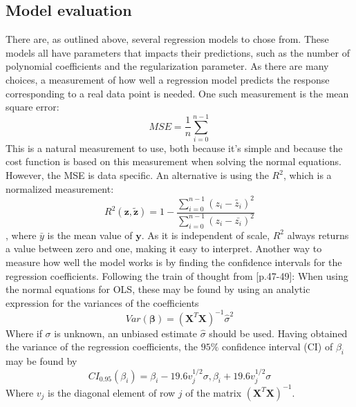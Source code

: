 \documentclass[%
oneside,                 %
final,                   %
10pt]{article}
\begin{document}
\subsection{Model evaluation} 
There are, as outlined above, several regression models to chose from. These models all have parameters that impacts their predictions, such as the number of polynomial coefficients and the regularization parameter. As there are many choices, a measurement of how well a regression model predicts the response corresponding to a real data point is needed. One such measurement is the mean square error:
\begin{equation}
MSE=\displaystyle \frac{1}{n}\sum_{i=0}^{n-1} \label{eq:MSE}
\end{equation}
This is a natural measurement to use, both because it's simple and because the cost function is based on this measurement when solving the normal equations. However, the MSE is data specific. An alternative is using the $R^2$, which is a normalized measurement:
\begin{equation}
R^2(\bm{z},\bm{\tilde{z}})=1-\frac{\sum_{i=0}^{n-1} (z_i - \tilde{z_i})^2 }{\sum_{i=0}^{n-1} (z_i - \bar{z_i})^2 }
\end{equation}
, where $\bar{y}$ is the mean value of $\bm{y}$. As it is independent of scale, $R^2$ always returns a value between zero and one, making it easy to interpret. \newline
Another way to measure how well the model works is by finding the confidence intervals for the regression coefficients. Following the train of thought from \citep{HastieTrevor2009TEoS}[p.47-49]: When using the normal equations for OLS, these may be found by using an analytic expression for the variances of the coefficients
\begin{equation}
Var(\bm{\beta})=(\bm{X}^T\bm{X})^{-1}\hat{\sigma}^2
\end{equation}
Where if $\sigma$ is unknown, an unbiased estimate $\hat{\sigma}$ should be used. Having obtained the variance of the regression coefficients, the $95\% $ confidence interval (CI) of $\beta_i$ may be found by 
\begin{equation}
CI_{0.95}(\beta_i)=\beta_i-19.6 v_j^{1/2}\sigma,\beta_i+19.6 v_j^{1/2}\sigma
\label{eq:M_conf_beta}
\end{equation}
Where $v_j$ is the diagonal element of row $j$ of the matrix $(\bm{X}^T\bm{X})^{-1}$.
\end{document}
